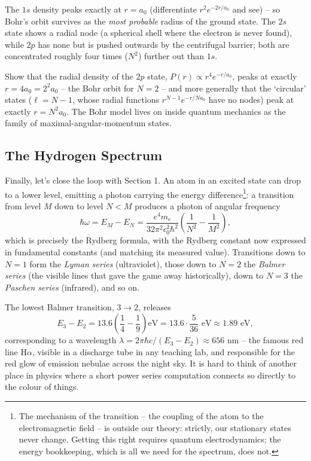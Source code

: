 The $1s$ density peaks exactly at $r = a_0$ (differentiate $r^2 e^{-2r/a_0}$ and see) -- so Bohr's orbit survives as the \emph{most probable} radius of the ground state. The $2s$ state shows a radial node (a spherical shell where the electron is never found), while $2p$ has none but is pushed outwards by the centrifugal barrier; both are concentrated roughly four times ($N^2$) further out than $1s$.

\begin{exercise}
    Show that the radial density of the $2p$ state, $P(r) \propto r^4 e^{-r/a_0}$, peaks at exactly $r = 4 a_0 = 2^2 a_0$ -- the Bohr orbit for $N = 2$ -- and more generally that the `circular' states ($\ell = N - 1$, whose radial functions $r^{N-1}e^{-r/Na_0}$ have no nodes) peak at exactly $r = N^2 a_0$. The Bohr model lives on inside quantum mechanics as the family of maximal-angular-momentum states.
\end{exercise}

\subsection{The Hydrogen Spectrum}

Finally, let's close the loop with Section 1. An atom in an excited state can drop to a lower level, emitting a photon carrying the energy difference\footnote{The mechanism of the transition -- the coupling of the atom to the electromagnetic field -- is outside our theory: strictly, our stationary states never change. Getting this right requires quantum electrodynamics; the energy bookkeeping, which is all we need for the spectrum, does not.}: a transition from level $M$ down to level $N < M$ produces a photon of angular frequency
$$
\hbar \omega = E_M - E_N = \frac{e^4 m_e}{32 \pi^2 \epsilon_0^2 \hbar^2} \left( \frac{1}{N^2} - \frac{1}{M^2} \right),
$$
which is precisely the Rydberg formula, with the Rydberg constant now expressed in fundamental constants (and matching its measured value). Transitions down to $N = 1$ form the \emph{Lyman series} (ultraviolet), those down to $N = 2$ the \emph{Balmer series} (the visible lines that gave the game away historically), down to $N = 3$ the \emph{Paschen series} (infrared), and so on.

\begin{example}
    The lowest Balmer transition, $3 \rightarrow 2$, releases
    $$
    E_3 - E_2 = 13.6 \left( \frac{1}{4} - \frac{1}{9} \right) \text{eV} = 13.6 \cdot \frac{5}{36} \text{ eV} \approx 1.89 \text{ eV},
    $$
    corresponding to a wavelength $\lambda = 2 \pi \hbar c / (E_3 - E_2) \approx 656$ nm -- the famous red line H$\alpha$, visible in a discharge tube in any teaching lab, and responsible for the red glow of emission nebulae across the night sky. It is hard to think of another place in physics where a short power series computation connects so directly to the colour of things.
\end{example}

